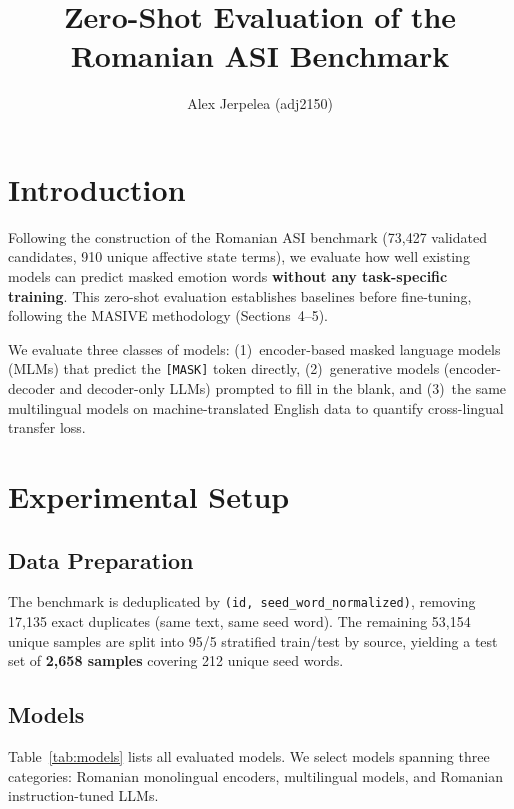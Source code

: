 \documentclass[11pt]{article}
\title{Zero-Shot Evaluation of the Romanian ASI Benchmark}
\author{Alex Jerpelea (adj2150)}
\begin{document}
\maketitle

\section{Introduction}

Following the construction of the Romanian ASI benchmark (73,427 validated candidates, 910 unique affective state terms), we evaluate how well existing models can predict masked emotion words \textbf{without any task-specific training}. This zero-shot evaluation establishes baselines before fine-tuning, following the MASIVE methodology \cite{masive2024} (Sections~4--5).

We evaluate three classes of models: (1)~encoder-based masked language models (MLMs) that predict the \texttt{[MASK]} token directly, (2)~generative models (encoder-decoder and decoder-only LLMs) prompted to fill in the blank, and (3)~the same multilingual models on machine-translated English data to quantify cross-lingual transfer loss.


\section{Experimental Setup}

\subsection{Data Preparation}

The benchmark is deduplicated by \texttt{(id, seed\_word\_normalized)}, removing 17,135 exact duplicates (same text, same seed word). The remaining 53,154 unique samples are split into 95/5 stratified train/test by source, yielding a test set of \textbf{2,658 samples} covering 212 unique seed words.

\subsection{Models}

Table~\ref{tab:models} lists all evaluated models. We select models spanning three categories: Romanian monolingual encoders, multilingual models, and Romanian instruction-tuned LLMs.
\end{document}
